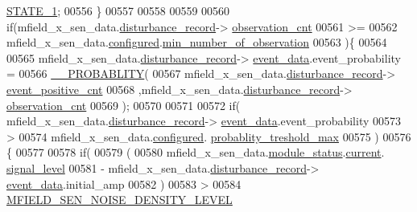\begin{DoxyCode}
      \hyperlink{a00021_a727351838367f27ac0adb9a13422c342}{STATE\_1};
00556             \}
00557 
00558 
00559 
00560                \textcolor{keywordflow}{if}(mfield\_x\_sen\_data.\hyperlink{a00025_ac9b38e2c1d3f1013a88d33506c754152}{disturbance\_record}->
      \hyperlink{a00028_ad5b0bac02ce266b91b2b52a1c3ea1d78}{observation\_cnt}
00561                 >=
00562                 mfield\_x\_sen\_data.\hyperlink{a00025_a94b2d1f6ea4ab334c74d24984dd27843}{configured}.\hyperlink{a00021_ae8665e8bf422c1482442d6949ba28408}{min\_number\_of\_observation}
00563                )\{
00564 
00565                     mfield\_x\_sen\_data.\hyperlink{a00025_ac9b38e2c1d3f1013a88d33506c754152}{disturbance\_record}->
      \hyperlink{a00028_a8c0bda69e71ef674e60da47ad0be9ab0}{event\_data}.event\_probability =
00566                            \hyperlink{a00021_ab2185512402ea26115af112ce48175b2}{\_\_PROBABLITY}(
00567                            mfield\_x\_sen\_data.\hyperlink{a00025_ac9b38e2c1d3f1013a88d33506c754152}{disturbance\_record}->
      \hyperlink{a00028_a7397b9d76d4b57500f27bb23d258a18a}{event\_positive\_cnt}
00568                           ,mfield\_x\_sen\_data.\hyperlink{a00025_ac9b38e2c1d3f1013a88d33506c754152}{disturbance\_record}->
      \hyperlink{a00028_ad5b0bac02ce266b91b2b52a1c3ea1d78}{observation\_cnt}
00569                            );
00570 
00571 
00572                    \textcolor{keywordflow}{if}( mfield\_x\_sen\_data.\hyperlink{a00025_ac9b38e2c1d3f1013a88d33506c754152}{disturbance\_record}->
      \hyperlink{a00028_a8c0bda69e71ef674e60da47ad0be9ab0}{event\_data}.event\_probability
00573                         >
00574                        mfield\_x\_sen\_data.\hyperlink{a00025_a94b2d1f6ea4ab334c74d24984dd27843}{configured}.
      \hyperlink{a00021_a7e2d217b9c9051d361319180a426851c}{probablity\_treshold\_max}
00575                      )
00576                    \{
00577 
00578                           \textcolor{keywordflow}{if}(
00579                             (
00580                             mfield\_x\_sen\_data.\hyperlink{a00025_adfab5a5d8b45a93dfb13edb24e2b80e3}{module\_status}.\hyperlink{a00019_acf41ffc11da291c2f9f0fcb02ee72b98}{current}.
      \hyperlink{a00019_a4070db8eab0ff93e3fbc1df59872f117}{signal\_level}
00581                             - mfield\_x\_sen\_data.\hyperlink{a00025_ac9b38e2c1d3f1013a88d33506c754152}{disturbance\_record}->
      \hyperlink{a00028_a8c0bda69e71ef674e60da47ad0be9ab0}{event\_data}.initial\_amp
00582                             )
00583                             >
00584                             \hyperlink{a00019_aafdb9e443a3251c41a62e1a1534673f9}{MFIELD\_SEN\_NOISE\_DENSITY\_LEVEL}

\end{DoxyCode}
